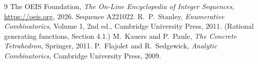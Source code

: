 \documentclass[11pt,a4paper]{article}
\theoremstyle{plain}
\theoremstyle{definition}
\begin{document}
\begin{thebibliography}{9}
 The OEIS Foundation, \emph{The On-Line Encyclopedia of Integer
Sequences}, \url{https://oeis.org}, 2026. Sequence A221022.
 R.~P.~Stanley, \emph{Enumerative Combinatorics}, Volume 1, 2nd ed.,
Cambridge University Press, 2011. (Rational generating functions, Section 4.1.)
 M.~Kauers and P.~Paule, \emph{The Concrete Tetrahedron}, Springer, 2011.
 P.~Flajolet and R.~Sedgewick, \emph{Analytic Combinatorics}, Cambridge
University Press, 2009.
\end{thebibliography}
\end{document}
